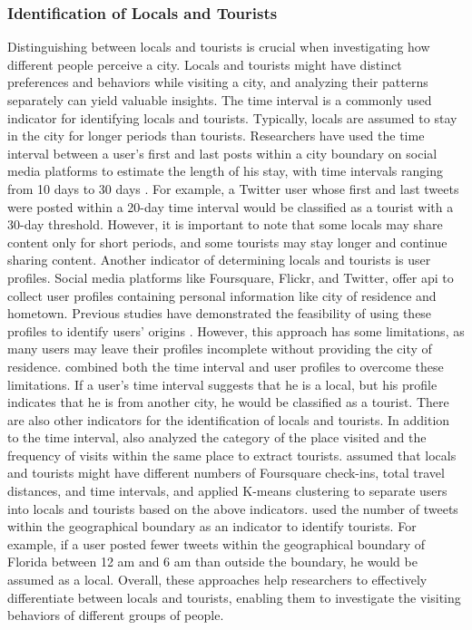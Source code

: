 \documentclass{article}
\begin{document}
\subsubsection{Identification of Locals and Tourists}
Distinguishing between locals and tourists is crucial when investigating how different people perceive a city. Locals and tourists might have distinct preferences and behaviors while visiting a city, and analyzing their patterns separately can yield valuable insights. The time interval is a commonly used indicator for identifying locals and tourists. Typically, locals are assumed to stay in the city for longer periods than tourists. Researchers have used the time interval between a user's first and last posts within a city boundary on social media platforms to estimate the length of his stay, with time intervals ranging from 10 days to 30 days \citep{girardin_digital_2008, hu_graph-based_2019, hopken_flickr_2020}. For example, a Twitter user whose first and last tweets were posted within a 20-day time interval would be classified as a tourist with a 30-day threshold. However, it is important to note that some locals may share content only for short periods, and some tourists may stay longer and continue sharing content. Another indicator of determining locals and tourists is user profiles. Social media platforms like Foursquare, Flickr, and Twitter, offer \acrshort{api} to collect user profiles containing personal information like city of residence and hometown. Previous studies have demonstrated the feasibility of using these profiles to identify users' origins \citep{ferreira_beyond_2015, li_analyzing_2018}. However, this approach has some limitations, as many users may leave their profiles incomplete without providing the city of residence. \cite{ferreira_uncovering_2020} combined both the time interval and user profiles to overcome these limitations. If a user's time interval suggests that he is a local, but his profile indicates that he is from another city, he would be classified as a tourist. There are also other indicators for the identification of locals and tourists. In addition to the time interval, \cite{hallot_who_2015} also analyzed the category of the place visited and the frequency of visits within the same place to extract tourists. \cite{yang_identifying_2021} assumed that locals and tourists might have different numbers of Foursquare check-ins, total travel distances, and time intervals, and applied K-means clustering to separate users into locals and tourists based on the above indicators. \cite{hasnat_identifying_2018} used the number of tweets within the geographical boundary as an indicator to identify tourists. For example, if a user posted fewer tweets within the geographical boundary of Florida between 12 am and 6 am than outside the boundary, he would be assumed as a local. Overall, these approaches help researchers to effectively differentiate between locals and tourists, enabling them to investigate the visiting behaviors of different groups of people.
\end{document}
